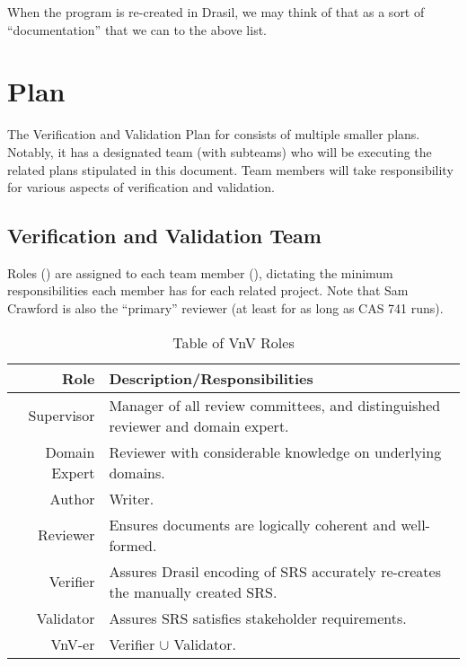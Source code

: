 \documentclass[12pt, titlepage]{article}
\begin{document}
\noindent{}When the \progname{} program is re-created in Drasil, we may think of
that as a sort of ``documentation'' that we can to the above list.

\newpage{}

\section{Plan}

The Verification and Validation Plan for \progname{} consists of multiple
smaller plans. Notably, it has a designated team (with subteams) who will be
executing the related plans stipulated in this document. Team members will take
responsibility for various aspects of verification and validation.

\subsection{Verification and Validation Team}

Roles () are assigned to each team member
(), dictating the minimum responsibilities each member
has for each related project. Note that Sam Crawford is also the ``primary''
reviewer (at least for as long as CAS 741 runs).

\begin{longtable}{|r|p{8cm}|}
    \caption{Table of VnV Roles}
    \label{table:vnv_roles}

    \\ \hline
    \rowcolor{Maroon}
    \textbf{Role}        & \textbf{Description/Responsibilities}                                           \\ \hline
    \rowcolor{White}
    Supervisor           & Manager of all review committees, and distinguished reviewer and domain expert. \\ \hline
    Domain Expert        & Reviewer with considerable knowledge on underlying domains.                     \\ \hline
    Author               & Writer.                                                                         \\ \hline
    Reviewer             & Ensures documents are logically coherent and well-formed.                       \\ \hline
    Verifier             & Assures Drasil encoding of SRS accurately re-creates the manually created SRS.  \\ \hline
    Validator            & Assures SRS satisfies stakeholder requirements.                                 \\ \hline
    VnV-er               & Verifier \(\cup\) Validator.                                                    \\ \hline
\end{longtable}
\end{document}
